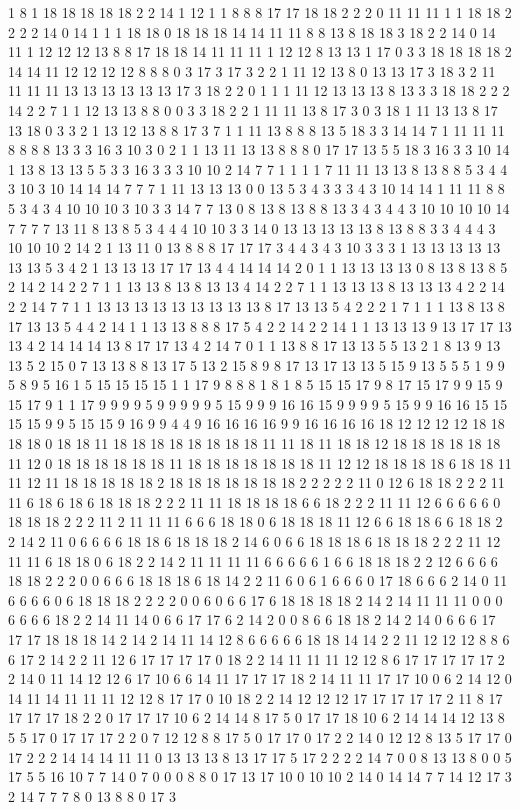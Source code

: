 1 8 1 18 18 18 18 18 2 2 14 1 12 1 1 8 8 8 17 17 18 18 2 2 2 0 11 11 11 1 1 18 18 2 2 2 2 14 0 14 1 1 1 18 18 0 18 18 18 14 14 11 11 8 8 13 8 18 18 3 18 2 2 14 0 14 11 1 12 12 12 13 8 8 17 18 18 14 11 11 11 1 12 12 8 13 13 1 17 0 3 3 18 18 18 18 2 14 14 11 12 12 12 12 8 8 8 0 3 17 3 17 3 2 2 1 11 12 13 8 0 13 13 17 3 18 3 2 11 11 11 11 13 13 13 13 13 13 17 3 18 2 2 0 1 1 1 11 12 13 13 13 8 13 3 3 18 18 2 2 2 14 2 2 7 1 1 12 13 13 8 8 0 0 3 3 18 2 2 1 11 11 13 8 17 3 0 3 18 1 11 13 13 8 17 13 18 0 3 3 2 1 13 12 13 8 8 17 3 7 1 1 11 13 8 8 8 13 5 18 3 3 14 14 7 1 11 11 11 8 8 8 8 13 3 3 16 3 10 3 0 2 1 1 13 11 13 13 8 8 8 0 17 17 13 5 5 18 3 16 3 3 10 14 1 13 8 13 13 5 5 3 3 16 3 3 3 10 10 2 14 7 7 1 1 1 1 7 11 11 13 13 8 13 8 8 5 3 4 4 3 10 3 10 14 14 14 7 7 7 1 11 13 13 13 0 0 13 5 3 4 3 3 3 4 3 10 14 14 1 11 11 8 8 5 3 4 3 4 10 10 10 3 10 3 3 14 7 7 13 0 8 13 8 13 8 8 13 3 4 3 4 4 3 10 10 10 10 14 7 7 7 7 13 11 8 13 8 5 3 4 4 4 10 10 3 3 14 0 13 13 13 13 13 8 13 8 8 3 3 4 4 4 3 10 10 10 2 14 2 1 13 11 0 13 8 8 8 17 17 17 3 4 4 3 4 3 10 3 3 3 1 13 13 13 13 13 13 13 5 3 4 2 1 13 13 13 17 17 13 4 4 14 14 14 2 0 1 1 13 13 13 13 0 8 13 8 13 8 5 2 14 2 14 2 2 7 1 1 13 13 8 13 8 13 13 4 14 2 2 7 1 1 13 13 13 8 13 13 13 4 2 2 14 2 2 14 7 7 1 1 13 13 13 13 13 13 13 13 13 8 17 13 13 5 4 2 2 2 1 7 1 1 1 13 8 13 8 17 13 13 5 4 4 2 14 1 1 13 13 8 8 8 17 5 4 2 2 14 2 2 14 1 1 13 13 13 9 13 17 17 13 13 4 2 14 14 14 13 8 17 17 13 4 2 14 7 0 1 1 13 8 8 17 13 13 5 5 13 2 1 8 13 9 13 13 5 2 15 0 7 13 13 8 8 13 17 5 13 2 15 8 9 8 17 13 17 13 13 5 15 9 13 5 5 5 1 9 9 5 8 9 5 16 1 5 15 15 15 15 1 1 17 9 8 8 8 1 8 1 8 5 15 15 17 9 8 17 15 17 9 9 15 9 15 17 9 1 1 17 9 9 9 9 5 9 9 9 9 9 5 15 9 9 9 16 16 15 9 9 9 9 5 15 9 9 16 16 15 15 15 15 9 9 5 15 15 9 16 9 9 4 4 9 16 16 16 16 9 9 16 16 16 16 18 12 12 12 12 18 18 18 18 0 18 18 11 18 18 18 18 18 18 18 18 11 11 18 11 18 18 12 18 18 18 18 18 18 11 12 0 18 18 18 18 18 18 11 18 18 18 18 18 18 18 11 12 12 18 18 18 18 6 18 18 11 11 12 11 18 18 18 18 18 2 18 18 18 18 18 18 18 2 2 2 2 2 11 0 12 6 18 18 2 2 2 11 11 6 18 6 18 6 18 18 18 2 2 2 11 11 18 18 18 18 6 6 18 2 2 2 11 11 12 6 6 6 6 6 0 18 18 18 2 2 2 11 2 11 11 11 6 6 6 18 18 0 6 18 18 18 11 12 6 6 18 18 6 6 18 18 2 2 14 2 11 0 6 6 6 6 18 18 6 18 18 18 2 14 6 0 6 6 18 18 18 6 18 18 18 2 2 2 11 12 11 11 6 18 18 0 6 18 2 2 14 2 11 11 11 11 6 6 6 6 6 1 6 6 18 18 18 2 2 12 6 6 6 6 18 18 2 2 2 0 0 6 6 6 18 18 18 6 18 14 2 2 11 6 0 6 1 6 6 6 0 17 18 6 6 6 2 14 0 11 6 6 6 6 0 6 18 18 18 2 2 2 2 0 0 6 0 6 6 17 6 18 18 18 18 2 14 2 14 11 11 11 0 0 0 6 6 6 6 18 2 2 14 11 14 0 6 6 17 17 6 2 14 2 0 0 8 6 6 18 18 2 14 2 14 0 6 6 6 17 17 17 18 18 18 14 2 14 2 14 11 14 12 8 6 6 6 6 6 18 18 14 14 2 2 11 12 12 12 8 8 6 6 17 2 14 2 2 11 12 6 17 17 17 17 0 18 2 2 14 11 11 11 12 12 8 6 17 17 17 17 17 2 2 14 0 11 14 12 12 6 17 10 6 6 14 11 17 17 17 18 2 14 11 11 17 17 10 0 6 2 14 12 0 14 11 14 11 11 11 12 12 8 17 17 0 10 18 2 2 14 12 12 12 17 17 17 17 17 2 11 8 17 17 17 17 18 2 2 0 17 17 17 10 6 2 14 14 8 17 5 0 17 17 18 10 6 2 14 14 14 12 13 8 5 5 17 0 17 17 17 2 2 0 7 12 12 8 8 17 5 0 17 17 0 17 2 2 14 0 12 12 8 13 5 17 17 0 17 2 2 2 14 14 14 11 11 0 13 13 13 8 13 17 17 5 17 2 2 2 2 14 7 0 0 8 13 13 8 0 0 5 17 5 5 16 10 7 7 14 0 7 0 0 0 8 8 0 17 13 17 10 0 10 10 2 14 0 14 14 7 7 14 12 17 3 2 14 7 7 7 8 0 13 8 8 0 17 3 